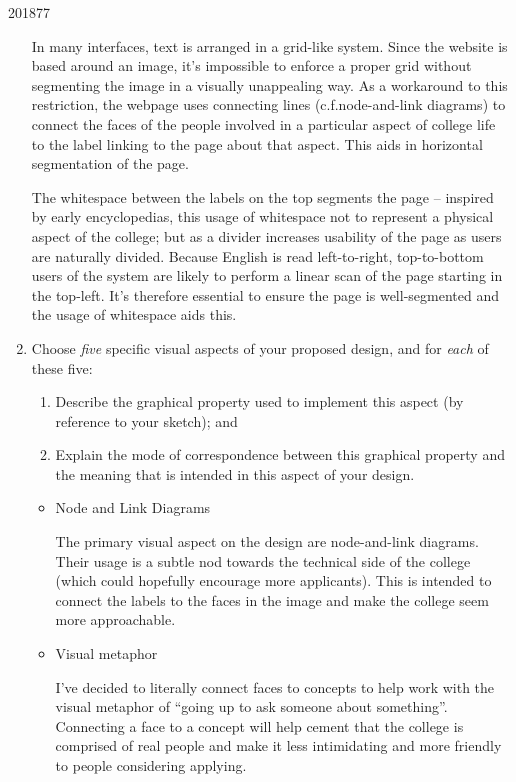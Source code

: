 \documentclass[10pt,\jkfside,a4paper]{article}
\begin{document}
\begin{examquestion}{2018}{7}{7}
\begin{enumerate}
In many interfaces, text is arranged in a grid-like system. Since the
website is based around an image, it's impossible to enforce a proper grid
without segmenting the image in a visually unappealing way. As a workaround
to this restriction, the webpage uses connecting lines (c.f.\@ node-and-link
diagrams) to connect the faces of the people involved in a particular aspect
of college life to the label linking to the page about that aspect. This
aids in horizontal segmentation of the page.

The whitespace between the labels on the top segments the page -- inspired
by early encyclopedias, this usage of whitespace not to represent a physical
aspect of the college; but as a divider increases usability of the page as
users are naturally divided. Because English is read left-to-right,
top-to-bottom users of the system are likely to perform a linear scan of the
page starting in the top-left. It's therefore essential to ensure the page
is well-segmented and the usage of whitespace aids this.

\item Choose \textit{five} specific visual aspects of your proposed design,
and for \textit{each} of these five:

\begin{enumerate}

\item Describe the graphical property used to implement this aspect (by
reference to your sketch); and

\item Explain the mode of correspondence between this graphical property and
the meaning that is intended in this aspect of your design.

\end{enumerate}

\begin{itemize}

\item Node and Link Diagrams

The primary visual aspect on the design are node-and-link diagrams. Their
usage is a subtle nod towards the technical side of the college (which
could hopefully encourage more applicants). This is intended to connect the
labels to the faces in the image and make the college seem more approachable.

\item Visual metaphor

I've decided to literally connect faces to concepts to help work with the
visual metaphor of ``going up to ask someone about something''. Connecting a
face to a concept will help cement that the college is comprised of real
people and make it less intimidating and more friendly to people considering
applying.


\end{itemize}
\end{enumerate}
\end{examquestion}
\end{document}
